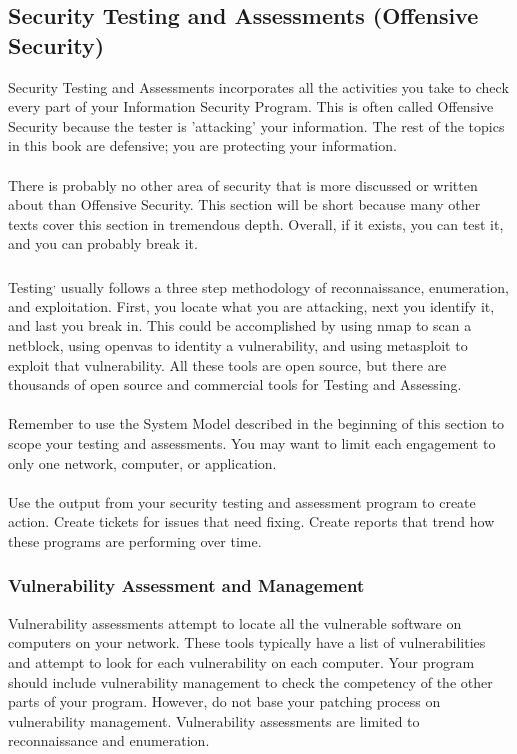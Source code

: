 \subsection{Security Testing and Assessments (Offensive Security)}
Security Testing and Assessments incorporates all the activities you take to check every part of your Information Security Program. This is often called Offensive Security because the tester is 'attacking' your information. The rest of the topics in this book are defensive; you are protecting your information.\\\\
There is probably no other area of security that is more discussed or written about than Offensive Security. This section will be short because many other texts cover this section in tremendous depth. Overall, if it exists, you can test it, and you can probably break it.\\\\
Testing\textsuperscript{,} usually follows a three step methodology of reconnaissance, enumeration, and exploitation. First, you locate what you are attacking, next you identify it, and last you break in. This could be accomplished by using nmap to scan a netblock, using openvas to identity a vulnerability, and using metasploit to exploit that vulnerability. All these tools are open source, but there are thousands of open source and commercial tools for Testing and Assessing.\\\\
Remember to use the System Model described in the beginning of this section to scope your testing and assessments. You may want to limit each engagement to only one network, computer, or application.\\\\
Use the output from your security testing and assessment program to create action. Create tickets for issues that need fixing. Create reports that trend how these programs are performing over time.
\subsubsection{Vulnerability Assessment and Management}
Vulnerability assessments attempt to locate all the vulnerable software on computers on your network. These tools typically have a list of vulnerabilities and attempt to look for each vulnerability on each computer. Your program should include vulnerability management to check the competency of the other parts of your program. However, do not base your patching process on vulnerability management. Vulnerability assessments are limited to reconnaissance and enumeration.
